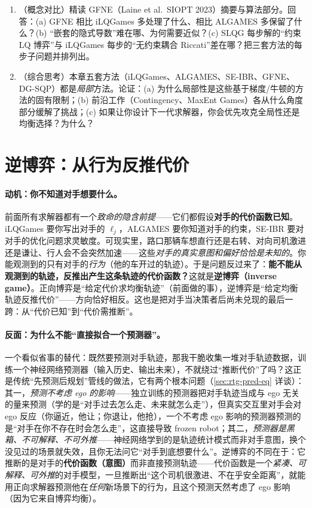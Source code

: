 \begin{practice}
\begin{enumerate}
  \item （概念对比）精读 GFNE（Laine et al.\ SIOPT 2023）摘要与算法部分。回答：(a) GFNE 相比 iLQGames 多处理了什么、相比 ALGAMES 多保留了什么？(b) “嵌套的隐式导数”难在哪、为何需要近似？(c) SLQG 每步解的“约束 LQ 博弈”与 iLQGames 每步的“无约束耦合 Riccati”差在哪？把三套方法的每步子问题并排列出。
  \item （综合思考）本章五套方法（iLQGames、ALGAMES、SE-IBR、GFNE、DG-SQP）都是\emph{局部}方法。论证：(a) 为什么局部性是这些基于梯度/牛顿的方法的固有限制；(b) 前沿工作（Contingency、MaxEnt Games）各从什么角度部分缓解了挑战；(c) 如果让你设计下一代求解器，你会优先攻克全局性还是均衡选择？为什么？
\end{enumerate}
\end{practice}

\section{逆博弈：从行为反推代价}
\label{sec:rtg-inverse}

\paragraph{动机：你不知道对手想要什么。}
前面所有求解器都有一个\emph{致命的隐含前提}——它们都假设\textbf{对手的代价函数已知}。iLQGames 要你写出对手的 $\ell_j$，ALGAMES 要你知道对手的约束，SE-IBR 要对对手的优化问题求灵敏度。可现实里，路口那辆车想直行还是右转、对向司机激进还是谦让、行人会不会突然加速——这些\emph{对手的真实意图和偏好恰恰是未知的}。你能观测到的只有对手的\emph{行为}（他的车开过的轨迹）。于是问题反过来了：\textbf{能不能从观测到的轨迹，反推出产生这条轨迹的代价函数？}这就是\textbf{逆博弈（inverse game）}。正向博弈是“给定代价求均衡轨迹”（前面做的事），逆博弈是“给定均衡轨迹反推代价”——方向恰好相反。这也是把对手当决策者后尚未兑现的最后一跨：从“代价已知”到“代价需推断”。

\paragraph{反面：为什么不能“直接拟合一个预测器”。}
一个看似省事的替代：既然要预测对手轨迹，那我干脆收集一堆对手轨迹数据，训练一个神经网络预测器（输入历史、输出未来），不就绕过“推断代价”了吗？这正是传统“先预测后规划”管线的做法，它有两个根本问题（\cref{sec:rtg-pred-eq} 详谈）：其一，\emph{预测不考虑 ego 的影响}——独立训练的预测器把对手轨迹当成与 ego 无关的量来预测（学的是“对手过去怎么走、未来就怎么走”），但真实交互里对手会对 ego 反应（你逼近，他让；你退让，他抢），一个不考虑 ego 影响的预测器预测的是“对手在你不存在时会怎么走”，这直接导致 frozen robot；其二，\emph{预测器是黑箱、不可解释、不可外推}——神经网络学到的是轨迹统计模式而非对手意图，换个没见过的场景就失效，且你无法问它“对手到底想要什么”。逆博弈的不同在于：它推断的是对手的\textbf{代价函数（意图）}而非直接预测轨迹——代价函数是一个\emph{紧凑、可解释、可外推}的对手模型，一旦推断出“这个司机很激进、不在乎安全距离”，就能用正向求解器预测他在\emph{任何}新场景下的行为，且这个预测天然考虑了 ego 影响（因为它来自博弈均衡）。

